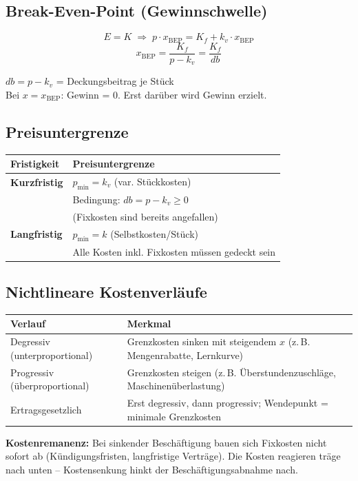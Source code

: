 \documentclass[10pt,a4paper]{article}
\begin{document}
\begin{multicols}{2}
\columnbreak

\subsection{Break-Even-Point (Gewinnschwelle)}

\begin{formelbox}
\[
E = K \;\Rightarrow\; p \cdot x_{\text{BEP}} = K_f + k_v \cdot x_{\text{BEP}}
\]
\[
\boxed{x_{\text{BEP}} = \frac{K_f}{p - k_v} = \frac{K_f}{db}}
\]
\end{formelbox}

$db = p - k_v$ = Deckungsbeitrag je Stück\\
Bei $x = x_{\text{BEP}}$: Gewinn = 0. Erst darüber wird Gewinn erzielt.

\subsection{Preisuntergrenze}

\begin{tabular}{|L{2.5cm}|L{5cm}|}
\hline
{}
\textbf{Fristigkeit} & \textbf{Preisuntergrenze} \\
\hline
\textbf{Kurzfristig} & $p_{\min} = k_v$ (var. Stückkosten)\\
& Bedingung: $db = p - k_v \geq 0$\\
& (Fixkosten sind bereits angefallen) \\
\hline
\textbf{Langfristig} & $p_{\min} = k$ (Selbstkosten/Stück)\\
& Alle Kosten inkl. Fixkosten müssen gedeckt sein \\
\hline
\end{tabular}

\subsection{Nichtlineare Kostenverläufe}

\begin{tabular}{|L{2.8cm}|L{4.5cm}|}
\hline
{}
\textbf{Verlauf} & \textbf{Merkmal} \\
\hline
Degressiv (unterproportional) & Grenzkosten sinken mit steigendem $x$ (z.\,B. Mengenrabatte, Lernkurve) \\
Progressiv (überproportional) & Grenzkosten steigen (z.\,B. Überstundenzuschläge, Maschinenüberlastung) \\
Ertragsgesetzlich & Erst degressiv, dann progressiv; Wendepunkt = minimale Grenzkosten \\
\hline
\end{tabular}

\vspace{4pt}
\begin{hinweisbox}
\textbf{Kostenremanenz:} Bei sinkender Beschäftigung bauen sich Fixkosten nicht sofort ab (Kündigungsfristen, langfristige Verträge). Die Kosten reagieren träge nach unten -- Kostensenkung hinkt der Beschäftigungsabnahme nach.
\end{hinweisbox}

\end{multicols}
\end{document}
